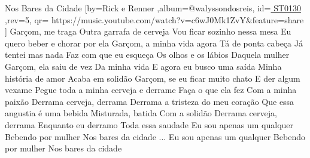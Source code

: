 \beginsong
{Nos Bares da Cidade %
}[by={Rick e Renner %
},album={@walyssondosreis},
id={\href{ https://music.youtube.com/watch?v=c6wJ0Mk1ZvY&feature=share
}{ ST0130  %
}},rev={5}, %
qr={ https://music.youtube.com/watch?v=c6wJ0Mk1ZvY&feature=share %
}]
\beginverse
Garçom, me traga 
Outra garrafa de cerveja
Vou ficar sozinho nessa mesa
Eu quero beber e chorar por ela 
\endverse
\beginverse
Garçom, a minha vida agora
Tá de ponta cabeça
Já tentei mas nada 
Faz com que eu esqueça
Os olhos e os lábios
Daquela mulher 
\endverse
\beginverse
Garçom, ela saiu de vez
Da minha vida
E agora eu busco uma saída
Minha história de amor 
Acaba em solidão
Garçom, se eu ficar muito chato
E der algum vexame
Pegue toda a minha cerveja e derrame
Faça o que ela fez
Com a minha paixão 
\endverse
\beginchorus
Derrama cerveja, derrama
Derrama a tristeza do meu coração
Que essa angustia é uma bebida
Misturada, batida
Com a solidão
Derrama cerveja, derrama
Enquanto eu derramo
Toda essa saudade
Eu sou apenas um qualquer
Bebendo por mulher
Nos bares da cidade
\endchorus
{}
\beginverse
... Eu sou apenas um qualquer
Bebendo por mulher
Nos bares da cidade
\endverse
{}
\vspace{4em} %
\begin{comment}
\lstset{basicstyle=\scriptsize\bf} %
\tab{Solo 1}
\begin{lstlisting}
E|-----------------------------------------------------|
B|-----------------------------------------------------|
G|-----------------------------------------------------|
D|-----------------------------------------------------|
A|-----------------------------------------------------|
E|-----------------------------------------------------|
\end{lstlisting}
\end{comment}
